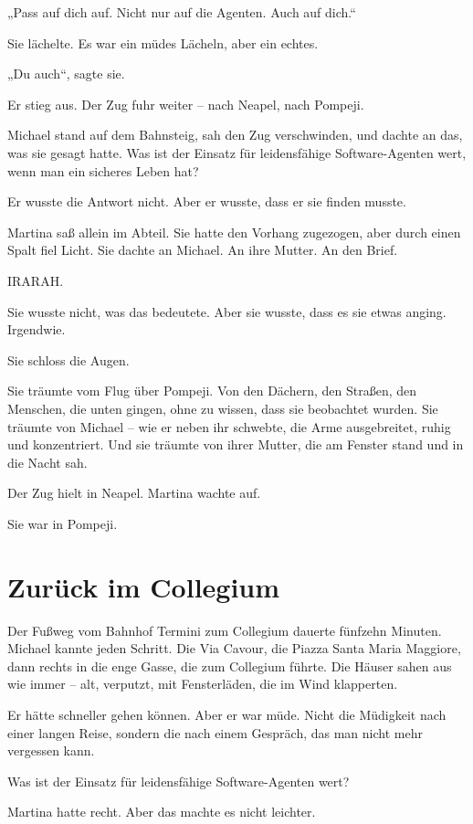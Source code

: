 \documentclass[
]{article}
\begin{document}
„Pass auf dich auf. Nicht nur auf die Agenten. Auch auf dich.``

Sie lächelte. Es war ein müdes Lächeln, aber ein echtes.

„Du auch``, sagte sie.

Er stieg aus. Der Zug fuhr weiter -- nach Neapel, nach Pompeji.

Michael stand auf dem Bahnsteig, sah den Zug verschwinden, und dachte an das, was sie gesagt hatte. Was ist der Einsatz für leidensfähige Software-Agenten wert, wenn man ein sicheres Leben hat?

Er wusste die Antwort nicht. Aber er wusste, dass er sie finden musste.

Martina saß allein im Abteil. Sie hatte den Vorhang zugezogen, aber durch einen Spalt fiel Licht. Sie dachte an Michael. An ihre Mutter. An den Brief.

IRARAH.

Sie wusste nicht, was das bedeutete. Aber sie wusste, dass es sie etwas anging. Irgendwie.

Sie schloss die Augen.

Sie träumte vom Flug über Pompeji. Von den Dächern, den Straßen, den Menschen, die unten gingen, ohne zu wissen, dass sie beobachtet wurden. Sie träumte von Michael -- wie er neben ihr schwebte, die Arme ausgebreitet, ruhig und konzentriert. Und sie träumte von ihrer Mutter, die am Fenster stand und in die Nacht sah.

Der Zug hielt in Neapel. Martina wachte auf.

Sie war in Pompeji.

\section{Zurück im Collegium}\label{zuruxfcck-im-collegium}

Der Fußweg vom Bahnhof Termini zum Collegium dauerte fünfzehn Minuten. Michael kannte jeden Schritt. Die Via Cavour, die Piazza Santa Maria Maggiore, dann rechts in die enge Gasse, die zum Collegium führte. Die Häuser sahen aus wie immer -- alt, verputzt, mit Fensterläden, die im Wind klapperten.

Er hätte schneller gehen können. Aber er war müde. Nicht die Müdigkeit nach einer langen Reise, sondern die nach einem Gespräch, das man nicht mehr vergessen kann.

Was ist der Einsatz für leidensfähige Software-Agenten wert?

Martina hatte recht. Aber das machte es nicht leichter.
\end{document}
